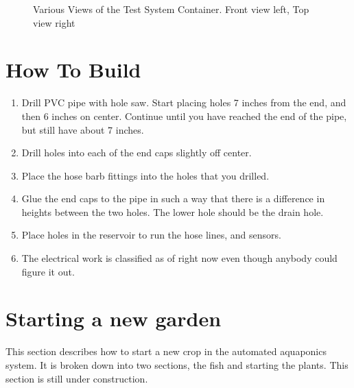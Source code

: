 \documentclass[american,12pt]{article}
\begin{document}
\begin{figure}[h]
    \centering
    \caption{Various Views of the Test System Container. Front view left, Top
    view right}
    \label{fig:views}
\end{figure}

\section{How To Build}
\begin{enumerate}
    \item Drill PVC pipe with hole saw. Start placing holes 7 inches from the
        end, and then 6 inches on center. Continue until you have reached
        the end of the pipe, but still have about 7 inches.
    \item Drill holes into each of the end caps slightly off center.
    \item Place the hose barb fittings into the holes that you drilled.
    \item Glue the end caps to the pipe in such a way that there is a difference
   	      in heights between the two holes. The lower hole should be the drain
   	      hole.
   	\item Place holes in the reservoir to run the hose lines, and sensors.
   	\item The electrical work is classified as of right now even though anybody
   	      could figure it out.
\end{enumerate}


\section{Starting a new garden}
This section describes how to start a new crop in the automated aquaponics
system. It is broken down into two sections, the fish and starting the plants.
This section is still under construction.
\end{document}
